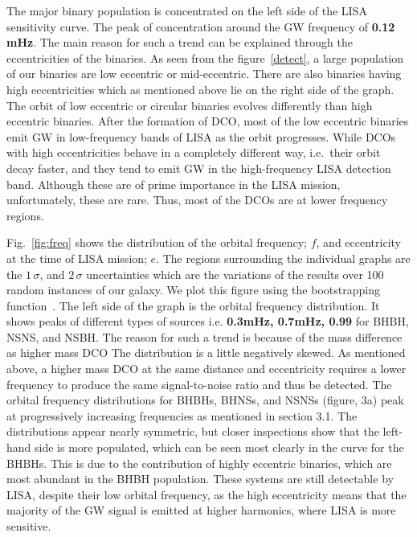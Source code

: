 \documentclass[journal, twocolumn]{IEEEtran}
\begin{document}
    The major binary population is concentrated on the left side of the LISA sensitivity curve.
    The peak of concentration around the GW frequency of \textbf{0.12 mHz}.
    The main reason for such a trend can be explained through the eccentricities of the binaries.
    As seen from the figure~\ref{detect}, a large population of our binaries are low eccentric or mid-eccentric.
    There are also binaries having high eccentricities which as mentioned above lie on the right side of the graph.
    The orbit of low eccentric or circular binaries evolves differently than high eccentric binaries.
    After the formation of DCO, most of the low eccentric binaries emit GW in low-frequency bands of LISA as the orbit progresses.
    While DCOs with high eccentricities behave in a completely different way, i.e.\ their orbit decay faster, and they tend to emit GW in the high-frequency LISA detection band.
    Although these are of prime importance in the LISA mission, unfortunately, these are rare.
    Thus, most of the DCOs are at lower frequency regions.

    Fig.~\ref{fig:freq} shows the distribution of the orbital frequency; $f$, and eccentricity at the time of LISA mission; $e$.
    The regions surrounding the individual graphs are the $1\,\sigma$, and $2\,\sigma$ uncertainties which are the variations of the results over 100 random instances of our galaxy.
    We plot this figure using the bootstrapping function~\cite{wagg2021gravitational}.
    The left side of the graph is the orbital frequency distribution.
    It shows peaks of different types of sources i.e. \textbf{0.3mHz, 0.7mHz, 0.99} for BHBH, NSNS, and NSBH\@.
    The reason for such a trend is because of the mass difference as higher mass DCO The distribution is a little negatively skewed.
    As mentioned above, a higher mass DCO at the same distance and eccentricity requires a lower frequency to produce the same signal-to-noise ratio and thus be detected.
    The orbital frequency distributions for BHBHs, BHNSs, and NSNSs (figure, 3a) peak at progressively increasing
    frequencies as mentioned in section 3.1.
    The distributions appear nearly symmetric, but closer inspections show that the left-hand side is more populated, which can be seen most clearly in the curve for the BHBHs.
    This is due to the contribution of highly eccentric binaries, which are most abundant in the BHBH population.
    These systems are still detectable by LISA, despite their low orbital frequency, as the high eccentricity means that the majority of the GW signal is emitted at higher harmonics, where LISA is more sensitive.
\end{document}
